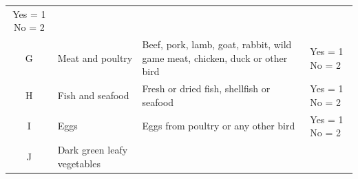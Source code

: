 \documentclass[12pt,]{book}
\theoremstyle{definition}
\theoremstyle{definition}
\theoremstyle{definition}
\theoremstyle{remark}
\begin{document}
\begin{longtable}[]{@{}clll@{}}
\begin{minipage}[t]{0.12\columnwidth}
Yes = 1 No = 2\strut
\end{minipage}\tabularnewline
\begin{minipage}[t]{0.05\columnwidth}\centering
G\strut
\end{minipage} & \begin{minipage}[t]{0.18\columnwidth}\raggedright
Meat and poultry\strut
\end{minipage} & \begin{minipage}[t]{0.54\columnwidth}\raggedright
Beef, pork, lamb, goat, rabbit, wild game meat, chicken, duck or other
bird\strut
\end{minipage} & \begin{minipage}[t]{0.12\columnwidth}\raggedright
Yes = 1 No = 2\strut
\end{minipage}\tabularnewline
\begin{minipage}[t]{0.05\columnwidth}\centering
H\strut
\end{minipage} & \begin{minipage}[t]{0.18\columnwidth}\raggedright
Fish and seafood\strut
\end{minipage} & \begin{minipage}[t]{0.54\columnwidth}\raggedright
Fresh or dried fish, shellfish or seafood\strut
\end{minipage} & \begin{minipage}[t]{0.12\columnwidth}\raggedright
Yes = 1 No = 2\strut
\end{minipage}\tabularnewline
\begin{minipage}[t]{0.05\columnwidth}\centering
I\strut
\end{minipage} & \begin{minipage}[t]{0.18\columnwidth}\raggedright
Eggs\strut
\end{minipage} & \begin{minipage}[t]{0.54\columnwidth}\raggedright
Eggs from poultry or any other bird\strut
\end{minipage} & \begin{minipage}[t]{0.12\columnwidth}\raggedright
Yes = 1 No = 2\strut
\end{minipage}\tabularnewline
\begin{minipage}[t]{0.05\columnwidth}\centering
J\strut
\end{minipage} & \begin{minipage}[t]{0.18\columnwidth}\raggedright
Dark green leafy vegetables\strut
\end{minipage} & \begin{minipage}[t]{0.54\columnwidth}\raggedright

\end{minipage}
\end{longtable}
\end{document}
